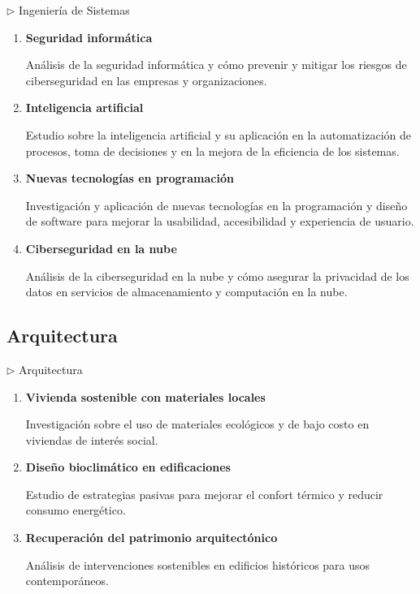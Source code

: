 \documentclass[12pt,a4paper]{article}
\begin{document}
\begin{careerbox}{$\triangleright$ Ingeniería de Sistemas}
	\begin{enumerate}
		\item \textbf{Seguridad informática}
		
		Análisis de la seguridad informática y cómo prevenir y mitigar los riesgos de ciberseguridad en las empresas y organizaciones.
		
		\item \textbf{Inteligencia artificial}
		
		Estudio sobre la inteligencia artificial y su aplicación en la automatización de procesos, toma de decisiones y en la mejora de la eficiencia de los sistemas.
		
		\item \textbf{Nuevas tecnologías en programación}
		
		Investigación y aplicación de nuevas tecnologías en la programación y diseño de software para mejorar la usabilidad, accesibilidad y experiencia de usuario.
		
		\item \textbf{Ciberseguridad en la nube}
		
		Análisis de la ciberseguridad en la nube y cómo asegurar la privacidad de los datos en servicios de almacenamiento y computación en la nube.
	\end{enumerate}
\end{careerbox}

\subsection{Arquitectura}
\begin{careerbox}{$\triangleright$ Arquitectura}
	\begin{enumerate}
		\item \textbf{Vivienda sostenible con materiales locales}
		
		Investigación sobre el uso de materiales ecológicos y de bajo costo en viviendas de interés social.
		\item \textbf{Diseño bioclimático en edificaciones}
		
		Estudio de estrategias pasivas para mejorar el confort térmico y reducir consumo energético.
		\item \textbf{Recuperación del patrimonio arquitectónico}
		
		Análisis de intervenciones sostenibles en edificios históricos para usos contemporáneos.
	\end{enumerate}
\end{careerbox}
\end{document}
